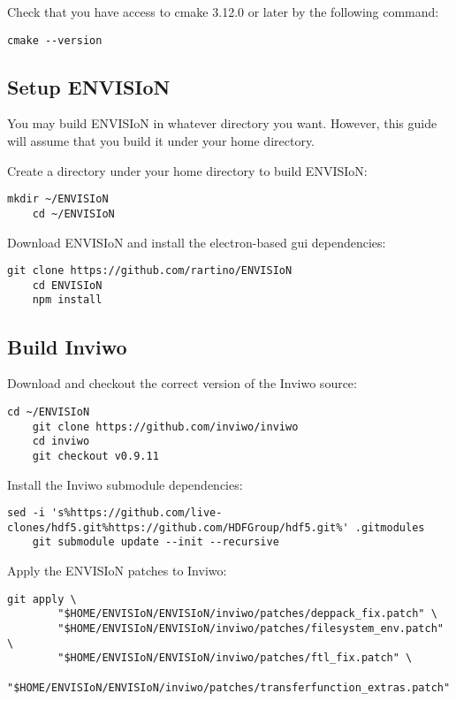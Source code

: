 Check that you have access to cmake 3.12.0 or later by the following command:
\begin{lstlisting}[frame = single, breaklines = true]
    cmake --version
\end{lstlisting}

\subsection{Setup ENVISIoN}
You may build ENVISIoN in whatever directory you want. However, this guide will assume that you build it under your home directory. 

Create a directory under your home directory to build ENVISIoN:

\begin{lstlisting}[frame = single, breaklines=true]
    mkdir ~/ENVISIoN
    cd ~/ENVISIoN
\end{lstlisting}

Download ENVISIoN and install the electron-based gui dependencies:

\begin{lstlisting}[frame = single, breaklines=true]
    git clone https://github.com/rartino/ENVISIoN
    cd ENVISIoN
    npm install
\end{lstlisting}

\subsection{Build Inviwo}
Download and checkout the correct version of the Inviwo source:

\begin{lstlisting}[frame = single, breaklines=true]
    cd ~/ENVISIoN
    git clone https://github.com/inviwo/inviwo
    cd inviwo
    git checkout v0.9.11
\end{lstlisting}

Install the Inviwo submodule dependencies:

\begin{lstlisting}[frame = single, breaklines=true]
    sed -i 's%https://github.com/live-clones/hdf5.git%https://github.com/HDFGroup/hdf5.git%' .gitmodules
    git submodule update --init --recursive
\end{lstlisting}

Apply the ENVISIoN patches to Inviwo:

\begin{lstlisting}[frame = single, breaklines=true]
    git apply \
        "$HOME/ENVISIoN/ENVISIoN/inviwo/patches/deppack_fix.patch" \
        "$HOME/ENVISIoN/ENVISIoN/inviwo/patches/filesystem_env.patch" \
        "$HOME/ENVISIoN/ENVISIoN/inviwo/patches/ftl_fix.patch" \
        "$HOME/ENVISIoN/ENVISIoN/inviwo/patches/transferfunction_extras.patch"
\end{lstlisting}
\newpage
